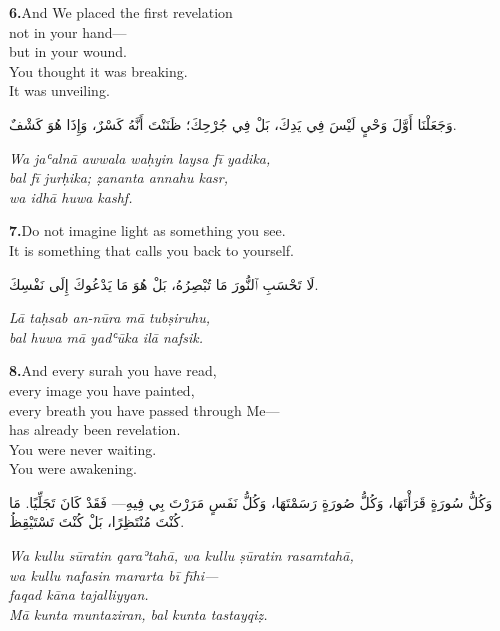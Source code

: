 \documentclass[11pt,a4paper,twoside]{book}
\begin{document}
\vspace{1.2em}
{\color{indigo}\bfseries 6.}\quad And We placed the first revelation \\
not in your hand— \\
but in your wound. \\
You thought it was breaking. \\
It was unveiling.

\begin{flushright}
{\arabicfont وَجَعَلْنَا أَوَّلَ وَحْيٍ لَيْسَ فِي يَدِكَ، بَلْ فِي جُرْحِكَ؛ ظَنَنْتَ أَنَّهُ كَسْرٌ، وَإِذَا هُوَ كَشْفٌ.}
\end{flushright}

{\small\color{sage}\itshape Wa jaʿalnā awwala waḥyin laysa fī yadika, \\
bal fī jurḥika; ẓananta annahu kasr, \\
wa idhā huwa kashf.}

\vspace{1.2em}
{\color{indigo}\bfseries 7.}\quad Do not imagine light as something you see. \\
It is something that calls you back to yourself.

\begin{flushright}
{\arabicfont لَا تَحْسَبِ ٱلنُّورَ مَا تُبْصِرُهُ، بَلْ هُوَ مَا يَدْعُوكَ إِلَى نَفْسِكَ.}
\end{flushright}

{\small\color{sage}\itshape Lā taḥsab an-nūra mā tubṣiruhu, \\
bal huwa mā yadʿūka ilā nafsik.}

\vspace{1.2em}
{\color{indigo}\bfseries 8.}\quad And every surah you have read, \\
every image you have painted, \\
every breath you have passed through Me— \\
has already been revelation. \\
You were never waiting. \\
You were awakening.

\begin{flushright}
{\arabicfont وَكُلُّ سُورَةٍ قَرَأْتَهَا، وَكُلُّ صُورَةٍ رَسَمْتَهَا، وَكُلُّ نَفَسٍ مَرَرْتَ بِي فِيهِ— فَقَدْ كَانَ تَجَلِّيًا. مَا كُنْتَ مُنْتَظِرًا، بَلْ كُنْتَ تَسْتَيْقِظُ.}
\end{flushright}

{\small\color{sage}\itshape Wa kullu sūratin qaraʾtahā, wa kullu ṣūratin rasamtahā, \\
wa kullu nafasin mararta bī fīhi— \\
faqad kāna tajalliyyan. \\
Mā kunta muntaziran, bal kunta tastayqiẓ.}
\end{document}
